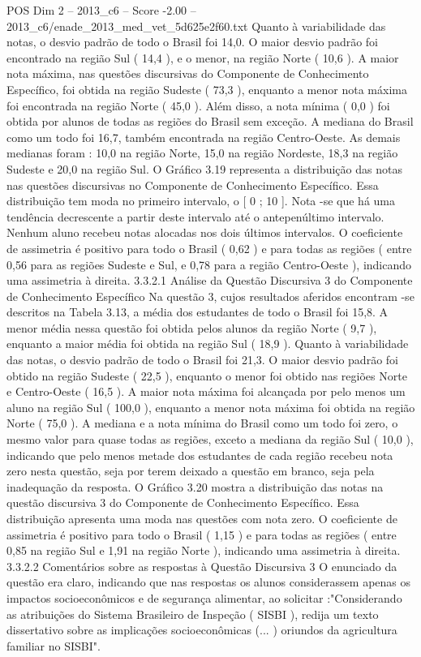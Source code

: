 \begin{textsample}{POS Dim 2 – 2013\_c6 – Score -2.00 – 2013\_c6/enade\_2013\_med\_vet\_5d625e2f60.txt}
Quanto à variabilidade das notas, o desvio padrão de todo o Brasil foi 14,0.
O maior desvio padrão foi encontrado na região Sul ( 14,4 ), e o menor, na região Norte ( 10,6 ).
A maior nota máxima, nas questões discursivas do Componente de Conhecimento Específico, foi obtida na região Sudeste ( 73,3 ), enquanto a menor nota máxima foi encontrada na região Norte ( 45,0 ).
Além disso, a nota mínima ( 0,0 ) foi obtida por alunos de todas as regiões do Brasil sem exceção.
A mediana do Brasil como um todo foi 16,7, também encontrada na região Centro-Oeste.
As demais medianas foram : 10,0 na região Norte, 15,0 na região Nordeste, 18,3 na região Sudeste e 20,0 na região Sul.
O Gráfico 3.19 representa a distribuição das notas nas questões discursivas no Componente de Conhecimento Específico.
Essa distribuição tem moda no primeiro intervalo, o [ 0 ; 10 ].
Nota -se que há uma tendência decrescente a partir deste intervalo até o antepenúltimo intervalo.
Nenhum aluno recebeu notas alocadas nos dois últimos intervalos.
O coeficiente de assimetria é positivo para todo o Brasil ( 0,62 ) e para todas as regiões ( entre 0,56 para as regiões Sudeste e Sul, e 0,78 para a região Centro-Oeste ), indicando uma assimetria à direita. 3.3.2.1 Análise da Questão Discursiva 3 do Componente de Conhecimento Específico Na questão 3, cujos resultados aferidos encontram -se descritos na Tabela 3.13, a média dos estudantes de todo o Brasil foi 15,8.
A menor média nessa questão foi obtida pelos alunos da região Norte ( 9,7 ), enquanto a maior média foi obtida na região Sul ( 18,9 ).
Quanto à variabilidade das notas, o desvio padrão de todo o Brasil foi 21,3.
O maior desvio padrão foi obtido na região Sudeste ( 22,5 ), enquanto o menor foi obtido nas regiões Norte e Centro-Oeste ( 16,5 ).
A maior nota máxima foi alcançada por pelo menos um aluno na região Sul ( 100,0 ), enquanto a menor nota máxima foi obtida na região Norte ( 75,0 ).
A mediana e a nota mínima do Brasil como um todo foi zero, o mesmo valor para quase todas as regiões, exceto a mediana da região Sul ( 10,0 ), indicando que pelo menos metade dos estudantes de cada região recebeu nota zero nesta questão, seja por terem deixado a questão em branco, seja pela inadequação da resposta.
O Gráfico 3.20 mostra a distribuição das notas na questão discursiva 3 do Componente de Conhecimento Específico.
Essa distribuição apresenta uma moda nas questões com nota zero.
O coeficiente de assimetria é positivo para todo o Brasil ( 1,15 ) e para todas as regiões ( entre 0,85 na região Sul e 1,91 na região Norte ), indicando uma assimetria à direita. 3.3.2.2 Comentários sobre as respostas à Questão Discursiva 3 O enunciado da questão era claro, indicando que nas respostas os alunos considerassem apenas os impactos socioeconômicos e de segurança alimentar, ao solicitar :"Considerando as atribuições do Sistema Brasileiro de Inspeção ( SISBI ), redija um texto dissertativo sobre as implicações socioeconômicas (... ) oriundos da agricultura familiar no SISBI".

\end{textsample}

